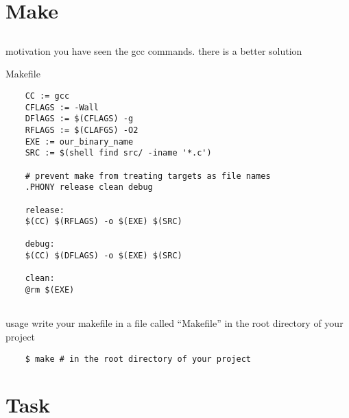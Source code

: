 \documentclass[10pt,graphics,aspectratio=169,table]{beamer}
\begin{document}
\section{Make}
\subsection{}

\begin{frame}{motivation}
  you have seen the gcc commands.
  \bigskip
  there is a better solution
\end{frame}

\begin{frame}[fragile]{Makefile}
  \begin{lstlisting}
    CC := gcc
    CFLAGS := -Wall
    DFlAGS := $(CFLAGS) -g
    RFLAGS := $(CLAFGS) -O2
    EXE := our_binary_name
    SRC := $(shell find src/ -iname '*.c')

    # prevent make from treating targets as file names
    .PHONY release clean debug 

    release: 
    $(CC) $(RFLAGS) -o $(EXE) $(SRC)

    debug:
    $(CC) $(DFLAGS) -o $(EXE) $(SRC)

    clean:
    @rm $(EXE)
    
  \end{lstlisting}
\end{frame}

\begin{frame}[fragile]{usage}
  write your makefile in a file called \enquote{Makefile} in the root directory
  of your project
  
  \begin{lstlisting}
    $ make # in the root directory of your project
  \end{lstlisting}
  
\end{frame}
\section{Task}
\end{document}
